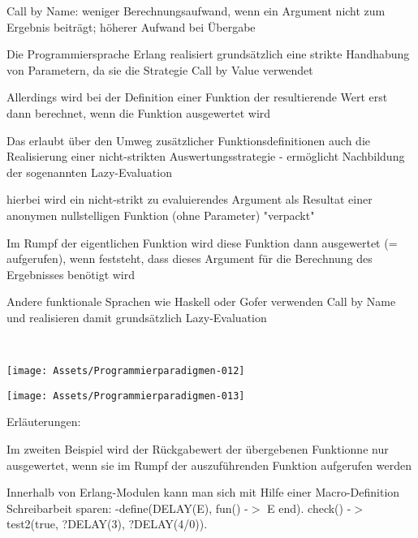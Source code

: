 \documentclass[10pt]{article}
\begin{document}
\begin{itemize*}
\begin{itemize*}
    \item Call by Name: weniger Berechnungsaufwand, wenn ein Argument nicht zum Ergebnis beiträgt; höherer Aufwand bei Übergabe
  \end{itemize*}
  \item Die Programmiersprache Erlang realisiert grundsätzlich eine strikte Handhabung von Parametern, da sie die Strategie Call by Value verwendet
  \item Allerdings wird bei der Definition einer Funktion der resultierende Wert erst dann berechnet, wenn die Funktion ausgewertet wird
  \begin{itemize*}
    \item Das erlaubt über den Umweg zusätzlicher Funktionsdefinitionen auch die Realisierung einer nicht-strikten Auswertungsstrategie - ermöglicht Nachbildung der sogenannten Lazy-Evaluation
    \item hierbei wird ein nicht-strikt zu evaluierendes Argument als Resultat einer anonymen nullstelligen Funktion (ohne Parameter) "verpackt"
    \item Im Rumpf der eigentlichen Funktion wird diese Funktion dann ausgewertet (= aufgerufen), wenn feststeht, dass dieses Argument für die Berechnung des Ergebnisses benötigt wird
    \item Andere funktionale Sprachen wie Haskell oder Gofer verwenden Call by Name und realisieren damit grundsätzlich Lazy-Evaluation
  \end{itemize*}
  \ \linebreak 
  \begin{center}
    \centering
    \texttt{[image: Assets/Programmierparadigmen-012]}
  \end{center}
  \begin{center}
    \centering
    \texttt{[image: Assets/Programmierparadigmen-013]}
  \end{center}
  \item Erläuterungen:
  \begin{itemize*}
    \item Im zweiten Beispiel wird der Rückgabewert der übergebenen Funktionne nur ausgewertet, wenn sie im Rumpf der auszuführenden Funktion aufgerufen werden
    \item Innerhalb von Erlang-Modulen kann man sich mit Hilfe einer Macro-Definition Schreibarbeit sparen: \newline -define(DELAY(E), fun() -$>$ E end). \newline check() -$>$ test2(true, ?DELAY(3), ?DELAY(4/0)).

\end{itemize*}
\end{itemize*}
\end{document}
